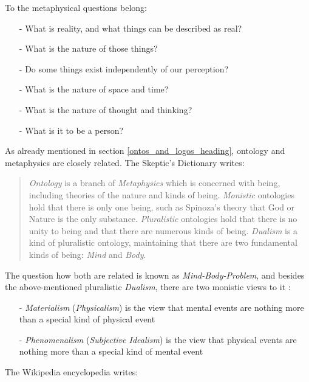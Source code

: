 To the metaphysical questions belong:

\begin{itemize}
    \item[-] What is reality, and what things can be described as real?
    \item[-] What is the nature of those things?
    \item[-] Do some things exist independently of our perception?
    \item[-] What is the nature of space and time?
    \item[-] What is the nature of thought and thinking?
    \item[-] What is it to be a person?
\end{itemize}

As already mentioned in section \ref{ontos_and_logos_heading}, ontology and
metaphysics are closely related. The Skeptic's Dictionary
\cite{skepticsdictionary} writes:

\begin{quote}
    \emph{Ontology} is a branch of \emph{Metaphysics} which is concerned with
    being, including theories of the nature and kinds of being. \emph{Monistic}
    ontologies hold that there is only one being, such as Spinoza's theory that
    God or Nature is the only substance. \emph{Pluralistic} ontologies hold that
    there is no unity to being and that there are numerous kinds of being.
    \emph{Dualism} is a kind of pluralistic ontology, maintaining that there
    are two fundamental kinds of being: \emph{Mind} and \emph{Body}.
\end{quote}

The question how both are related is known as \emph{Mind-Body-Problem}, and
besides the above-mentioned pluralistic \emph{Dualism}, there are two monistic
views to it \cite{wikipedia}:

\begin{itemize}
    \item[-] \emph{Materialism} (\emph{Physicalism}) is the view that mental
        events are nothing more than a special kind of physical event
    \item[-] \emph{Phenomenalism} (\emph{Subjective Idealism}) is the view that
        physical events are nothing more than a special kind of mental event
\end{itemize}

\newpage

The Wikipedia encyclopedia \cite{wikipedia} writes:

